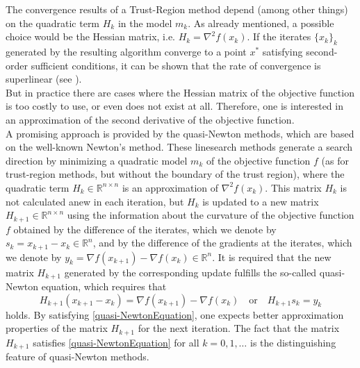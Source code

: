 The convergence results of a Trust-Region method depend (among other things) on the quadratic term $H_k$ in the model $m_k$. As already mentioned, a possible choice would be the Hessian matrix, i.e. $H_k = \nabla^2 f(x_k)$. If the iterates $\{ x_k \}_k$ generated by the resulting algorithm converge to a point $x^*$ satisfying second-order sufficient conditions, it can be shown that the rate of convergence is superlinear (see \cite[4.4~Local~convergence~of~trust-region~Newton~methods]{NocedalWright:2006}). \\
But in practice there are cases where the Hessian matrix of the objective function is too costly to use, or even does not exist at all. Therefore, one is interested in an approximation of the second derivative of the objective function. \\
A promising approach is provided by the quasi-Newton methods, which are based on the well-known Newton's method. These linesearch methods generate a search direction by minimizing a quadratic model $m_k$ of the objective function $f$ (as for trust-region methods, but without the boundary of the trust region), where the quadratic term $H_k \in \mathbb{R}^{n \times n}$ is an approximation of $\nabla^{2} f(x_k)$. This matrix $H_k$ is not calculated anew in each iteration, but $H_k$ is updated to a new matrix $H_{k+1} \in \mathbb{R}^{n \times n}$ using the information about the curvature of the objective function $f$ obtained by the difference of the iterates, which we denote by $s_k = x_{k+1} - x_k \in \mathbb{R}^n$, and by the difference of the gradients at the iterates, which we denote by $y_k = \nabla f(x_{k+1}) - \nabla f(x_k) \in \mathbb{R}^n$. It is required that the new matrix $H_{k+1}$ generated by the corresponding update fulfills the so-called quasi-Newton equation, which requires that
\begin{equation}\label{quasi-NewtonEquation}
    H_{k+1} (x_{k+1} - x_k) = \nabla f(x_{k+1}) - \nabla f(x_k) \quad \text{or} \quad H_{k+1} s_k = y_k
\end{equation}
holds. By satisfying \cref{quasi-NewtonEquation}, one expects better approximation properties of the matrix $H_{k+1}$ for the next iteration. The fact that the matrix $H_{k+1}$ satisfies \cref{quasi-NewtonEquation} for all $k = 0, 1, \ldots$ is the distinguishing feature of quasi-Newton methods. \\

